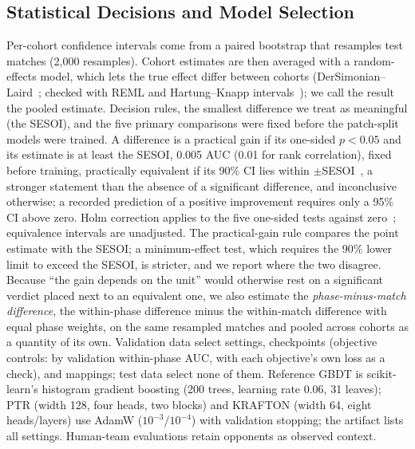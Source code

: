 \documentclass[sigconf,anonymous]{acmart}
\begin{document}
\subsection{Statistical Decisions and Model Selection}
Per-cohort confidence intervals come from a paired bootstrap that resamples test matches (2,000 resamples). Cohort estimates are then averaged with a random-effects model, which lets the true effect differ between cohorts (DerSimonian--Laird~\cite{DerSimonian86}; checked with REML and Hartung--Knapp intervals~\cite{HartungKnapp01}); we call the result the pooled estimate. Decision rules, the smallest difference we treat as meaningful (the SESOI), and the five primary comparisons were fixed before the patch-split models were trained. A difference is a practical gain if its one-sided $p<0.05$ and its estimate is at least the SESOI, 0.005 AUC (0.01 for rank correlation), fixed before training, practically equivalent if its 90\% CI lies within $\pm$SESOI~\cite{Schuirmann87}, a stronger statement than the absence of a significant difference, and inconclusive otherwise; a recorded prediction of a positive improvement requires only a 95\% CI above zero. Holm correction applies to the five one-sided tests against zero~\cite{Holm79}; equivalence intervals are unadjusted. The practical-gain rule compares the point estimate with the SESOI; a minimum-effect test, which requires the 90\% lower limit to exceed the SESOI, is stricter, and we report where the two disagree. Because ``the gain depends on the unit'' would otherwise rest on a significant verdict placed next to an equivalent one, we also estimate the \emph{phase-minus-match difference}, the within-phase difference minus the within-match difference with equal phase weights, on the same resampled matches and pooled across cohorts as a quantity of its own. Validation data select settings, checkpoints (objective controls: by validation within-phase AUC, with each objective's own loss as a check), and mappings; test data select none of them. Reference GBDT is scikit-learn's histogram gradient boosting (200 trees, learning rate 0.06, 31 leaves); PTR (width 128, four heads, two blocks) and KRAFTON (width 64, eight heads/layers) use AdamW ($10^{-3}$/$10^{-4}$) with validation stopping; the artifact lists all settings. Human-team evaluations retain opponents as observed context.

\end{document}
